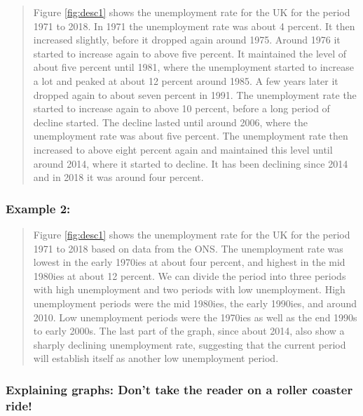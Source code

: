 \documentclass[]{book}
\begin{document}
\begin{quote}
Figure \ref{fig:desc1} shows the unemployment rate for the UK for the period 1971 to 2018. In 1971 the unemployment rate was about 4 percent. It then increased slightly, before it dropped again around 1975. Around 1976 it started to increase again to above five percent. It maintained the level of about five percent until 1981, where the unemployment started to increase a lot and peaked at about 12 percent around 1985. A few years later it dropped again to about seven percent in 1991. The unemployment rate the started to increase again to above 10 percent, before a long period of decline started. The decline lasted until around 2006, where the unemployment rate was about five percent. The unemployment rate then increased to above eight percent again and maintained this level until around 2014, where it started to decline. It has been declining since 2014 and in 2018 it was around four percent.
\end{quote}

\hypertarget{example-2}{%
\subsubsection*{Example 2:}\label{example-2}}

\begin{quote}
Figure \ref{fig:desc1} shows the unemployment rate for the UK for the period 1971 to 2018 based on data from the ONS. The unemployment rate was lowest in the early 1970ies at about four percent, and highest in the mid 1980ies at about 12 percent. We can divide the period into three periods with high unemployment and two periods with low unemployment. High unemployment periods were the mid 1980ies, the early 1990ies, and around 2010. Low unemployment periods were the 1970ies as well as the end 1990s to early 2000s. The last part of the graph, since about 2014, also show a sharply declining unemployment rate, suggesting that the current period will establish itself as another low unemployment period.
\end{quote}

\hypertarget{explaining-graphs-dont-take-the-reader-on-a-roller-coaster-ride}{%
\subsubsection*{Explaining graphs: Don't take the reader on a roller coaster ride!}\label{explaining-graphs-dont-take-the-reader-on-a-roller-coaster-ride}}
\end{document}
